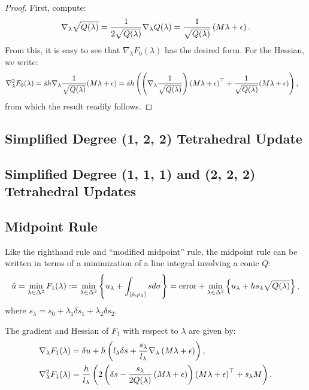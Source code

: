 \documentclass{article}
\begin{document}
\begin{proof}
  First, compute:
  \begin{align*}
    \nabla_\lambda \sqrt{Q(\lambda)} = \frac{1}{2 \sqrt{Q(\lambda)}} \nabla_\lambda Q(\lambda) = \frac{1}{\sqrt{Q(\lambda)}}\left(M\lambda + \epsilon\right).
  \end{align*}
  From this, it is easy to see that $\nabla_\lambda F_0(\lambda)$ has
  the desired form. For the Hessian, we write:
  \begin{align*}
    \nabla_\lambda^2 F_0(\lambda)
    &= \hat{s}h \nabla_\lambda \frac{1}{\sqrt{Q(\lambda)}}{(M\lambda + \epsilon)} = \hat{s}h \left(\left(\nabla_\lambda \frac{1}{\sqrt{Q(\lambda)}}\right) {(M\lambda + \epsilon)}^\top + \frac{1}{\sqrt{Q(\lambda)}} {(M\lambda + \epsilon)}\right),
  \end{align*}
  from which the result readily follows.
\end{proof}

\subsection{Simplified Degree (1, 2, 2) Tetrahedral Update}

\subsection{Simplified Degree (1, 1, 1) and (2, 2, 2) Tetrahedral Updates}

\subsection{Midpoint Rule}

Like the righthand rule and ``modified midpoint'' rule, the midpoint
rule can be written in terms of a minimization of a line integral
involving a conic $Q$:
\begin{align*}
  \hat{u} = \min_{\lambda \in \Delta^2} F_1(\lambda) := \min_{\lambda \in \Delta^2} \left\{u_\lambda + \int_{[\hat{p}, p_\lambda]} sd\sigma\right\} = \mbox{error} + \min_{\lambda \in \Delta^2} \left\{u_\lambda + h s_\lambda \sqrt{Q(\lambda)}\right\},
\end{align*}
where $s_\lambda = s_0 + \lambda_1 \delta s_1 + \lambda_2 \delta s_2$.

\begin{lemma}
  The gradient and Hessian of $F_1$ with respect to $\lambda$ are given by:
  \begin{align*}
    \nabla_\lambda F_1(\lambda) &= \delta u + h \left(l_\lambda \delta s + \frac{s_\lambda}{l_\lambda} \nabla_\lambda \left(M\lambda + \epsilon\right)\right), \\
    \nabla^2_\lambda F_1(\lambda) &= \frac{h}{l_\lambda} \left(2\left(\delta s - \frac{s_\lambda}{2Q(\lambda)}\left(M\lambda + \epsilon\right)\right)\left(M\lambda + \epsilon\right)^\top + s_\lambda M\right).
  \end{align*}
\end{lemma}
\end{document}
